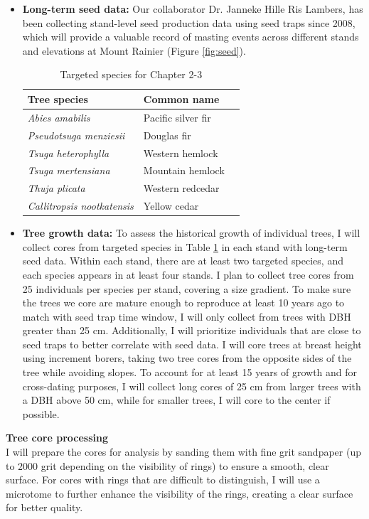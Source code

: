 \documentclass[11pt,letter]{article}
\begin{document}
\begin{itemize}
	\item \textbf{Long-term seed data:} Our collaborator Dr. Janneke Hille Ris Lambers, has been collecting stand-level seed production data using seed traps since 2008, which will provide a valuable record of masting events across different stands and elevations at Mount Rainier  (Figure \ref{fig:seed}).
\begin{table}[!h]
\centering
\small
\caption{Targeted species for Chapter 2-3}
\begin{tabular}{|p{5cm}|p{5cm}|p{5cm}|}
\hline
 \textbf{Tree species} & \textbf{Common name}\\ \hline 
\textit{Abies amabilis} & Pacific silver fir \\ \hline
\textit{Pseudotsuga menziesii} & Douglas fir\\ \hline
\textit{Tsuga heterophylla} & Western hemlock\\ \hline
\textit{Tsuga mertensiana} & Mountain hemlock\\ \hline
\textit{Thuja plicata} & Western redcedar\\ \hline
\textit{Callitropsis nootkatensis} & Yellow cedar\\ \hline
\end{tabular}
\label{table:species}
\end{table}
	\item \textbf{Tree growth data:}  To assess the historical growth of individual trees, I will collect cores from targeted species in Table \ref{table:species} in each stand with long-term seed data. Within each stand, there are at least two targeted species, and each species appears in at least four stands. I plan to collect tree cores from 25 individuals per species per stand, covering a size gradient. To make sure the trees we core are mature enough to reproduce at least 10 years ago to match with seed trap time window, I will only collect from trees with DBH greater than 25 cm. Additionally, I will prioritize individuals that are close to seed traps to better correlate with seed data. I will core trees at breast height using increment borers, taking two tree cores from the opposite sides of the tree while avoiding slopes. To account for at least 15 years of growth and for cross-dating purposes, I will collect long cores of 25 cm from larger trees with a DBH above 50 cm, while for smaller trees, I will core to the center if possible.
	\end{itemize}
\textbf{Tree core processing}\\
I will prepare the cores for analysis by sanding them with fine grit sandpaper (up to 2000 grit depending on the visibility of rings) to ensure a smooth, clear surface. For cores with rings that are difficult to distinguish, I will use a microtome to further enhance the visibility of the rings, creating a clear surface for better quality.
\end{document}
